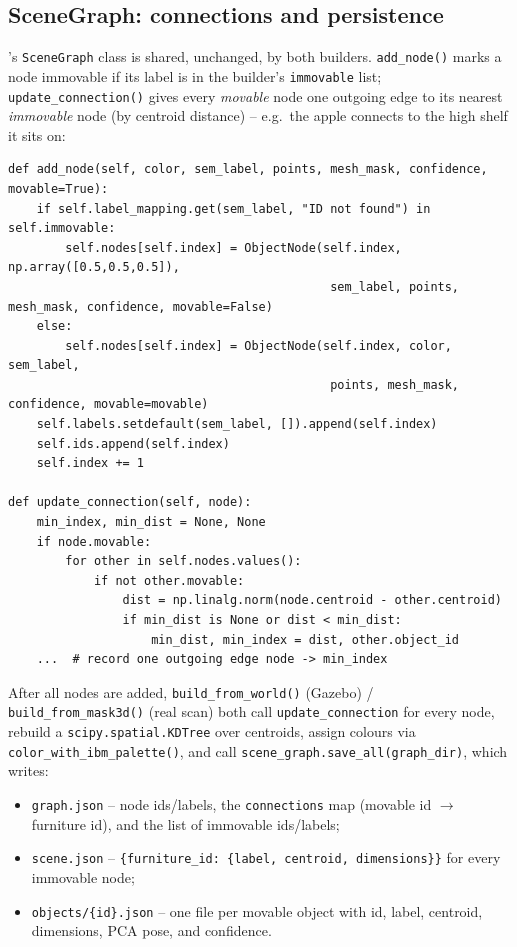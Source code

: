 \documentclass[11pt]{article}
\begin{document}
\subsection{SceneGraph: connections and persistence}
\label{sec:scenegraphclass}

's \texttt{SceneGraph} class
is shared, unchanged, by both builders. \texttt{add\_node()} marks a node
immovable if its label is in the builder's \texttt{immovable} list;
\texttt{update\_connection()} gives every \emph{movable} node one outgoing
edge to its nearest \emph{immovable} node (by centroid distance) -- e.g.\ the
apple connects to the high shelf it sits on:

\begin{lstlisting}[caption={\texttt{scene\_graph.py}: \texttt{add\_node} and \texttt{update\_connection}}]
def add_node(self, color, sem_label, points, mesh_mask, confidence, movable=True):
    if self.label_mapping.get(sem_label, "ID not found") in self.immovable:
        self.nodes[self.index] = ObjectNode(self.index, np.array([0.5,0.5,0.5]),
                                             sem_label, points, mesh_mask, confidence, movable=False)
    else:
        self.nodes[self.index] = ObjectNode(self.index, color, sem_label,
                                             points, mesh_mask, confidence, movable=movable)
    self.labels.setdefault(sem_label, []).append(self.index)
    self.ids.append(self.index)
    self.index += 1

def update_connection(self, node):
    min_index, min_dist = None, None
    if node.movable:
        for other in self.nodes.values():
            if not other.movable:
                dist = np.linalg.norm(node.centroid - other.centroid)
                if min_dist is None or dist < min_dist:
                    min_dist, min_index = dist, other.object_id
    ...  # record one outgoing edge node -> min_index
\end{lstlisting}

After all nodes are added, \texttt{build\_from\_world()} (Gazebo) /
\texttt{build\_from\_mask3d()} (real scan) both call \texttt{update\_connection}
for every node, rebuild a \texttt{scipy.spatial.KDTree} over centroids, assign
colours via \texttt{color\_with\_ibm\_palette()}, and call
\texttt{scene\_graph.save\_all(graph\_dir)}, which writes:

\begin{itemize}
  \item \texttt{graph.json} -- node ids/labels, the \texttt{connections} map (movable id $\to$ furniture id), and the list of immovable ids/labels;
  \item \texttt{scene.json} -- \texttt{\{furniture\_id: \{label, centroid, dimensions\}\}} for every immovable node;
  \item \texttt{objects/\{id\}.json} -- one file per movable object with id, label, centroid, dimensions, PCA pose, and confidence.
\end{itemize}
\end{document}
